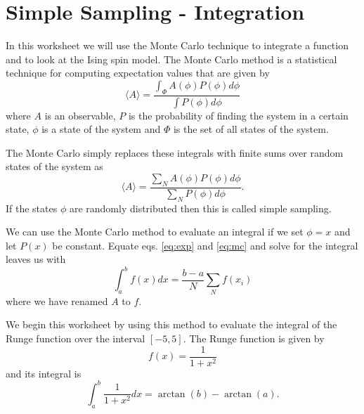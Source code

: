 \section{Simple Sampling - Integration}
In this worksheet we will use the Monte Carlo technique to integrate a function and to look at the Ising 
spin model. The Monte Carlo method is a statistical technique for computing expectation values that are 
given by
\begin{equation}
\langle A \rangle = \frac{\int_\Phi A(\phi) P(\phi) d\phi}{\int P(\phi) d\phi}
\label{eq:exp}
\end{equation}
where $A$ is an observable, $P$ is the probability of finding the system in a certain state, $\phi$ is a state of the system and $\Phi$ is the set of all states of the system.

The Monte Carlo simply replaces these integrals with finite sums over random states of the system as
\begin{equation}
\langle A \rangle = \frac{\sum_N A(\phi) P(\phi) d\phi}{\sum_N P(\phi) d\phi}.
\label{eq:mc}
\end{equation}
If the states $\phi$ are randomly distributed then this is called simple sampling.

We can use the Monte Carlo method to evaluate an integral if we set $\phi = x$ and let $P(x)$ be constant. Equate eqs. \ref{eq:exp} and \ref{eq:mc} and solve for the integral leaves us with
\begin{equation}
\int_a^b f(x) dx = \frac{b-a}{N} \sum_N f(x_i)
\label{eq:int}
\end{equation}
where we have renamed $A$ to $f$.

We begin this worksheet by using this method to evaluate the integral of the Runge function over the interval $[-5, 5]$. The Runge function is given by
\begin{equation}
f(x) = \frac{1}{1+x^2}
\end{equation}
and its integral is 
\begin{equation}
\int_a^b \frac{1}{1+x^2} dx = \arctan(b)-\arctan(a).
\end{equation}

